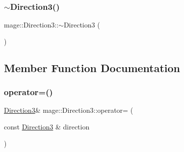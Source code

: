 \hypertarget{structmage_1_1_direction3_a583c087dc366d206aaf54a33bc90c50b}{}\label{structmage_1_1_direction3_a583c087dc366d206aaf54a33bc90c50b} 
\subsubsection{\texorpdfstring{$\sim$\+Direction3()}{~Direction3()}}
{\footnotesize\ttfamily mage\+::\+Direction3\+::$\sim$\+Direction3 (\begin{DoxyParamCaption}{ }\end{DoxyParamCaption})\hspace{0.3cm}{\ttfamily [default]}}



\subsection{Member Function Documentation}
\hypertarget{structmage_1_1_direction3_a3b3251fcafc37b39bad2c89e5faa09bd}{}\label{structmage_1_1_direction3_a3b3251fcafc37b39bad2c89e5faa09bd} 
\subsubsection{\texorpdfstring{operator=()}{operator=()}}
{\footnotesize\ttfamily \hyperlink{structmage_1_1_direction3}{Direction3}\& mage\+::\+Direction3\+::operator= (\begin{DoxyParamCaption}\item[{const \hyperlink{structmage_1_1_direction3}{Direction3} \&}]{direction }\end{DoxyParamCaption})}

